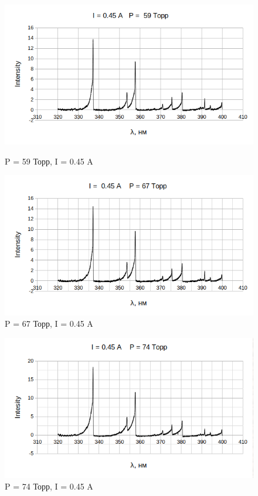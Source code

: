 \documentclass[a4paper,12pt]{article}
\begin{document}
	\begin{figure}[h]
	\begin{center}
	\begin{minipage}[h]{0.45\linewidth}
	\includegraphics[width=1\linewidth]{59_full}
	\caption{P = 59 Торр, I = 0.45 A} %
	\end{minipage}
	\hfill
	\begin{minipage}[h]{0.45\linewidth}
	\includegraphics[width=1\linewidth]{67_full}
	\caption{P = 67 Торр, I = 0.45 A}
	\end{minipage}
	\end{center}
	\end{figure}
	
	\begin{figure}[h]
	\begin{center}
	\begin{minipage}[h]{0.45\linewidth}
	\includegraphics[width=1\linewidth]{74_full}
	\caption{P = 74 Торр, I = 0.45 A} %
	\end{minipage}
	\hfill
	\end{center}
	\end{figure}
	
\end{document}
